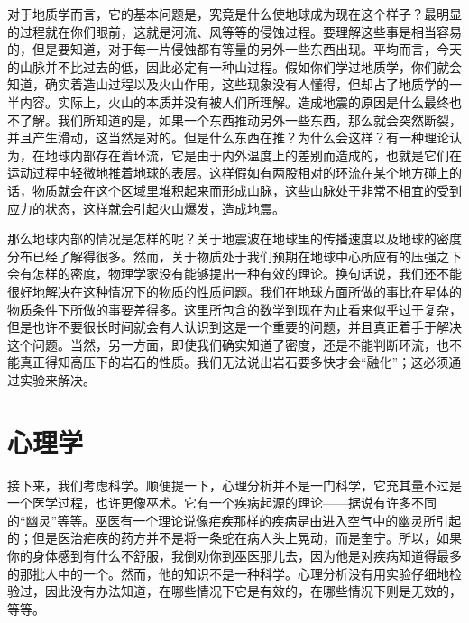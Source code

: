 \documentclass[11pt,oneside]{book}
\begin{document}
\begin{common-format}
对于地质学而言，它的基本问题是，究竟是什么使地球成为现在这个样子？最明显的过程就在你们眼前，这就是河流、风等等的侵蚀过程。要理解这些事是相当容易的，但是要知道，对于每一片侵蚀都有等量的另外一些东西出现。平均而言，今天的山脉并不比过去的低，因此必定有一种山过程。假如你们学过地质学，你们就会知道，确实着造山过程以及火山作用，这些现象没有人懂得，但却占了地质学的一半内容。实际上，火山的本质并没有被人们所理解。造成地震的原因是什么最终也不了解。我们所知道的是，如果一个东西推动另外一些东西，那么就会突然断裂，并且产生滑动，这当然是对的。但是什么东西在推？为什么会这样？有一种理论认为，在地球内部存在着环流，它是由于内外温度上的差别而造成的，也就是它们在运动过程中轻微地推着地球的表层。这样假如有两股相对的环流在某个地方碰上的话，物质就会在这个区域里堆积起来而形成山脉，这些山脉处于非常不相宜的受到应力的状态，这样就会引起火山爆发，造成地震。

那么地球内部的情况是怎样的呢？关于地震波在地球里的传播速度以及地球的密度分布已经了解得很多。然而，关于物质处于我们预期在地球中心所应有的压强之下会有怎样的密度，物理学家没有能够提出一种有效的理论。换句话说，我们还不能很好地解决在这种情况下的物质的性质问题。我们在地球方面所做的事比在星体的物质条件下所做的事要差得多。这里所包含的数学到现在为止看来似乎过于复杂，但是也许不要很长时间就会有人认识到这是一个重要的问题，并且真正着手于解决这个问题。当然，另一方面，即使我们确实知道了密度，还是不能判断环流，也不能真正得知高压下的岩石的性质。我们无法说出岩石要多快才会“融化”；这必须通过实验来解决。


\section{心理学}
接下来，我们考虑科学。顺便提一下，心理分析并不是一门科学，它充其量不过是一个医学过程，也许更像巫术。它有一个疾病起源的理论——据说有许多不同的“幽灵”等等。巫医有一个理论说像疟疾那样的疾病是由进入空气中的幽灵所引起的；但是医治疟疾的药方并不是将一条蛇在病人头上晃动，而是奎宁。所以，如果你的身体感到有什么不舒服，我倒劝你到巫医那儿去，因为他是对疾病知道得最多的那批人中的一个。然而，他的知识不是一种科学。心理分析没有用实验仔细地检验过，因此没有办法知道，在哪些情况下它是有效的，在哪些情况下则是无效的，等等。


\end{common-format}
\end{document}
